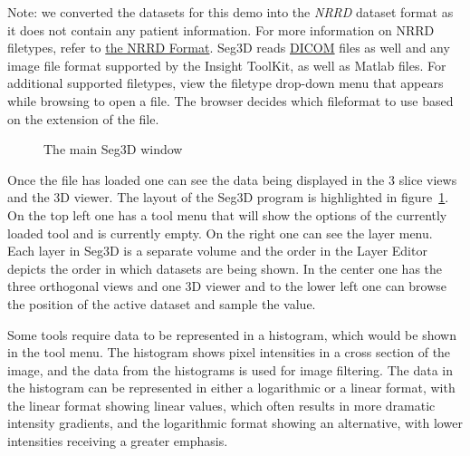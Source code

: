 \documentclass[fleqn,11pt,openany]{book}
\begin{document}
Note: we converted the datasets for this demo into the {\em NRRD} dataset format as it does not contain any patient information. For more information on NRRD filetypes, refer to \href{http://teem.sourceforge.net/nrrd/format.html}{the NRRD Format}. Seg3D reads \href{http://en.wikipedia.org/wiki/DICOM}{DICOM} files as well and any image file format supported by the Insight ToolKit, as well as Matlab files. For additional supported filetypes, view the filetype drop-down menu that appears while browsing to open a file. The browser decides which fileformat to use based on the extension of the file.

\begin{figure}
\caption{The main Seg3D window}\label{fig:MainSeg3DWindow}
\end{figure}


Once the file has loaded one can see the data being displayed in the 3 slice views and the 3D viewer. The layout of the Seg3D program is highlighted in figure~\ref{fig:MainSeg3DWindow}. On the top left one has a tool menu that will show the options of the currently loaded tool and is currently empty. On the right one can see the layer menu. Each layer in Seg3D is a separate volume and the order in the Layer Editor depicts the order in which datasets are being shown. In the center one has the three orthogonal views and one 3D viewer and to the lower left one can browse the position of the active dataset and sample the value.


Some tools require data to be represented in a histogram, which would be shown in the tool menu. The histogram shows pixel intensities in a cross section of the image, and the data from the histograms is used for image filtering. The data in the histogram can be represented in either a logarithmic or a linear format, with the linear format showing linear values, which often results in more dramatic intensity gradients, and the logarithmic format showing an alternative, with lower intensities receiving a greater emphasis.
\end{document}
